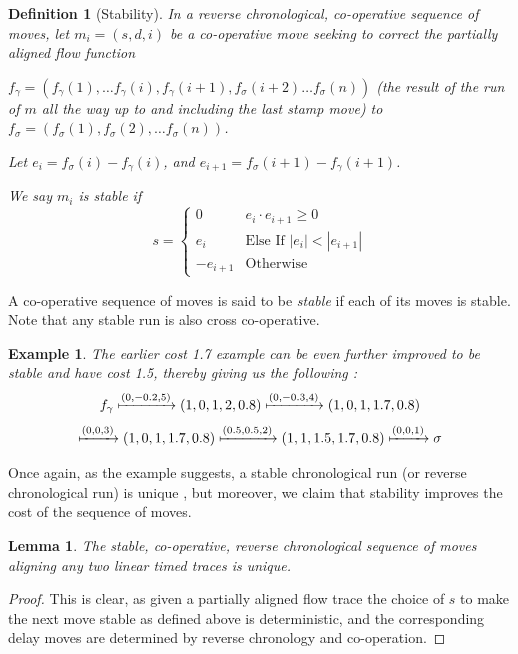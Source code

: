\documentclass[conference]{IEEEtran}
\newcounter{cases}
\newtheorem{lemma}[theorem]{Lemma}
\newtheorem{definition}{Definition}
\newtheorem{example}{Example}
\begin{document}
	\begin{definition}[Stability]
		In a reverse chronological, co-operative sequence of moves, let  ${m_i = (s, d, i)}$ be a co-operative move seeking to correct the partially aligned flow function 
		
		$f_\gamma = (f_\gamma(1), \dots f_\gamma(i), f_\gamma(i+1), f_\sigma(i+2) \dots f_\sigma(n))$ (the result of the run of $m$ all the way up to and including the last stamp move) to $f_\sigma = (f_\sigma(1), f_\sigma(2), \dots f_\sigma(n))$. 
		
		Let $e_i = f_\sigma(i) - f_\gamma(i)$, and $e_{i+1} = f_\sigma(i+1) - f_\gamma(i+1)$. 
		
		We say $m_i$ is \textit{stable} if 
		$$s = \begin{cases}
			0 & e_i\cdot e_{i+1} \geq 0 \\
			e_i & \textrm{Else If }|e_i| < |e_{i+1}| \\
			-e_{i+1} & \textrm{Otherwise}
		\end{cases}$$
	\end{definition}
	
	A co-operative sequence of moves is said to be \textit{stable} if each of its moves is stable.
	Note that any stable run is also cross co-operative. 
	
		\begin{example}
		The earlier cost 1.7 example can be even further improved to be stable and have cost 1.5, thereby giving us the following :
		$$f_\gamma \xmapsto{(0, -0.2, 5)} (1, 0, 1, 2, 0.8) \xmapsto{(0, -0.3, 4)} (1, 0, 1, 1.7, 0.8)$$$$ \xmapsto{(0, 0, 3)} (1, 0, 1, 1.7, 0.8) \xmapsto{(0.5, 0.5, 2)} (1, 1, 1.5, 1.7, 0.8) \xmapsto{(0, 0, 1)} \sigma $$
		
	\end{example}
	
	Once again, as the example suggests, a stable chronological run (or reverse chronological run) is unique , but moreover, we claim that stability improves the cost of the sequence of moves.  
	
	\begin{lemma}\label{stableunique} The stable, co-operative, reverse chronological sequence of moves aligning any two linear timed traces is unique. 
	\end{lemma}
	
	\begin{proof}
		This is clear, as given a partially aligned flow trace the choice of $s$ to make the next move stable as defined above is deterministic, and the corresponding delay moves are determined by reverse chronology and co-operation. 
	\end{proof}
	
\end{document}
